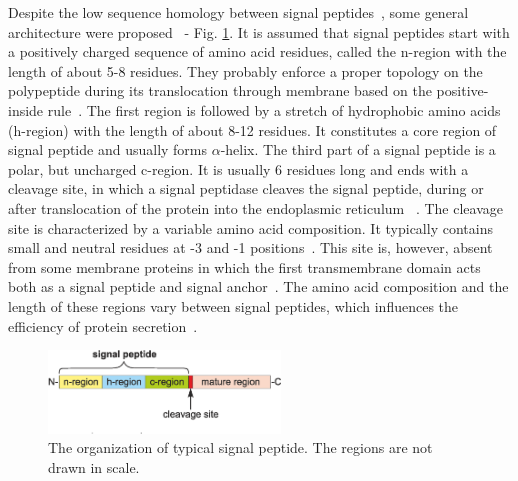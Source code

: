 \documentclass[10pt,letterpaper]{article}
\begin{document}
Despite the low sequence homology between signal peptides~\cite{1999ladungaphysean}, some general architecture were proposed~\cite{1994izardsignal, 2013vossmechanism} - Fig. \ref{fig:sparch}. It is assumed that signal peptides start with a positively charged sequence of amino acid residues, called the n-region with the length of about 5-8 residues. They probably enforce a proper topology on the polypeptide during its translocation through membrane based on the positive-inside rule~\cite{1988vonheijnetopogenic}. The first region is followed by a stretch of hydrophobic amino acids (h-region) with the length of about 8-12 residues. It constitutes a core region of signal peptide and usually forms $\alpha$-helix. The third part of a signal peptide is a polar, but uncharged c-region. It is usually 6 residues long and ends with a cleavage site, in which a signal peptidase cleaves the signal peptide, during or after translocation of the protein into the endoplasmic reticulum ~\cite{2002paetzelsignal}. The cleavage site is characterized by a variable amino acid composition. It typically contains small and neutral residues at -3 and -1 positions~\cite{1994palzkillselection}. This site is, however, absent from some membrane proteins in which the first transmembrane domain acts both as a signal peptide and signal anchor~\cite{1988szczesnaskorupapositive}. The amino acid composition and the length of these regions vary between signal peptides, which influences the efficiency of protein secretion~\cite{2006hegdethe}.

\begin{figure}[ht]\centering
\includegraphics[width=0.55\textwidth]{figures/SP.eps}
\caption{The organization of typical signal peptide. The regions are not drawn in scale.}
\label{fig:sparch}
\end{figure}
\end{document}
